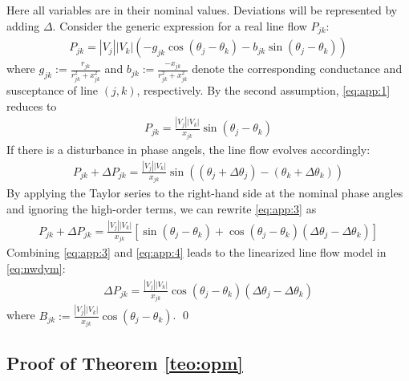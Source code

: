 \documentclass[journal,12pt,onecolumn,draftclsnofoot]{IEEEtran}
\begin{document}
Here all variables are in their nominal values. Deviations will be represented by adding $\Delta$.
Consider the generic expression for a real line flow $P_{jk}$:
\begin{eqnarray}\label{eq:app:1}
     P_{jk}= |V_j||V_k|\left(-g_{jk}\cos(\theta_j-\theta_k)-b_{jk}\sin(\theta_j-\theta_k)\right)
\end{eqnarray} 
where $g_{jk}:=\frac{r_{jk}}{r_{jk}^2+x_{jk}^2}$ and $b_{jk}:=\frac{-x_{jk}}{r_{jk}^2+x_{jk}^2}$ denote the corresponding conductance and susceptance of line $(j,k)$, respectively. By the second assumption, \eqref{eq:app:1} reduces to
\begin{eqnarray}\label{eq:app:2}
P_{jk}= \frac{|V_j||V_k|}{x_{jk}}\sin(\theta_j-\theta_k)
\end{eqnarray} 
If there is a disturbance in phase angels, the line flow evolves accordingly:
\begin{eqnarray}\label{eq:app:3}
P_{jk} + \Delta P_{jk}= \frac{|V_j||V_k|}{x_{jk}}\sin((\theta_j+\Delta \theta_j)-(\theta_k+\Delta \theta_k))
\end{eqnarray} 
By applying the Taylor series to the right-hand side at the nominal phase angles and ignoring the high-order terms, we can rewrite \eqref{eq:app:3} as 
 \begin{eqnarray}\label{eq:app:4}
  P_{jk} + \Delta P_{jk}= \frac{|V_j||V_k|}{x_{jk}}\left[\sin(\theta_j-\theta_k)+\cos(\theta_j-\theta_k)(\Delta \theta_j-\Delta \theta_k)\right]
  \end{eqnarray} 
Combining \eqref{eq:app:3} and \eqref{eq:app:4} leads to the linearized line flow model in \eqref{eq:nwdym}:
 \begin{eqnarray}\label{eq:app:5}
\Delta P_{jk}= \frac{|V_j||V_k|}{x_{jk}}\cos(\theta_j-\theta_k)(\Delta \theta_j-\Delta \theta_k)
\end{eqnarray} 
where $B_{jk}:=\frac{|V_j||V_k|}{x_{jk}}\cos(\theta_j-\theta_k)$.
\qed



\subsection{Proof of Theorem \ref{teo:opm}}
\end{document}
